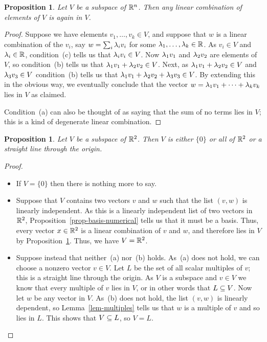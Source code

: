 \documentclass[reqno]{amsart}
\newtheorem{proposition}[theorem]{Proposition}
\theoremstyle{definition}
\begin{document}
\begin{proposition}\label{prop-subspace-lin-comb}
 Let $V$ be a subspace of ${\mathbb{R}}^n$.  Then any linear combination of
 elements of $V$ is again in $V$.
\end{proposition}
\begin{proof}
 Suppose we have elements $v_1,\dotsc,v_k\in V$, and suppose that $w$
 is a linear combination of the $v_i$, say $w=\sum_i\lambda_iv_i$ for some
 $\lambda_1,\dotsc,\lambda_k\in{\mathbb{R}}$.  As $v_i\in V$ and $\lambda_i\in{\mathbb{R}}$,
 condition~(c) tells us that $\lambda_iv_i\in V$.  Now $\lambda_1v_1$ and
 $\lambda_2v_2$ are elements of $V$, so condition~(b) tells us that
 $\lambda_1v_1+\lambda_2v_2\in V$.  Next, as $\lambda_1v_1+\lambda_2v_2\in V$ and
 $\lambda_3v_3\in V$ condition~(b) tells us that
 $\lambda_1v_1+\lambda_2v_2+\lambda_3v_3\in V$.  By extending this in the obvious
 way, we eventually conclude that the vector
 $w=\lambda_1v_1+\dotsb+\lambda_kv_k$ lies in $V$ as claimed.

 Condition~(a) can also be thought of as saying that the sum of no
 terms lies in $V$; this is a kind of degenerate linear combination.
\end{proof}

\begin{proposition}\label{prop-plane-subspaces}
 Let $V$ be a subspace of ${\mathbb{R}}^2$.  Then $V$ is either $\{0\}$ or all
 of ${\mathbb{R}}^2$ or a straight line through the origin.
\end{proposition}
\begin{proof}
 \begin{itemize}
  \item[(a)] If $V=\{0\}$ then there is nothing more to say.
  \item[(b)] Suppose that $V$ contains two vectors $v$ and $w$ such
   that the list $(v,w)$ is linearly independent.  As this is a
   linearly independent list of two vectors in ${\mathbb{R}}^2$,
   Proposition~\ref{prop-basis-numerical} tells us that it must be a
   basis.  Thus, every vector $x\in{\mathbb{R}}^2$ is a linear combination of
   $v$ and $w$, and therefore lies in $V$ by
   Proposition~\ref{prop-subspace-lin-comb}.  Thus, we have $V={\mathbb{R}}^2$.
  \item[(c)] Suppose instead that neither~(a) nor~(b) holds.  As~(a)
   does not hold, we can choose a nonzero vector $v\in V$.  Let $L$ be
   the set of all scalar multiples of $v$; this is a straight line
   through the origin.  As $V$ is a subspace and $v\in V$ we know that
   every multiple of $v$ lies in $V$, or in other words that
   $L\subseteq V$.  Now let $w$ be any vector in $V$.  As~(b) does
   not hold, the list $(v,w)$ is linearly dependent, so
   Lemma~\ref{lem-multiples} tells us that $w$ is a multiple of $v$
   and so lies in $L$.  This shows that $V\subseteq L$, so $V=L$.
   \qedhere
 \end{itemize}
\end{proof}
\end{document}
